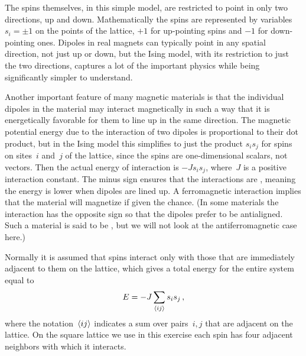 \documentclass[12pt]{article}
\begin{document}
\begin{exercises}
The spins themselves, in this simple model, are restricted to point in only
two directions, up and down.  Mathematically the spins are represented by
variables~$s_i=\pm1$ on the points of the lattice, $+1$ for up-pointing
spins and $-1$ for down-pointing ones.  Dipoles in real magnets can
typically point in any spatial direction, not just up or down, but the
Ising model, with its restriction to just the two directions, captures a
lot of the important physics while being significantly simpler to
understand.

Another important feature of many magnetic materials is that the individual
dipoles in the material may interact magnetically in such a way that it is
energetically favorable for them to line up in the same direction.  The
magnetic potential energy due to the interaction of two dipoles is
proportional to their dot product, but in the Ising model this simplifies
to just the product $s_is_j$ for spins on sites~$i$ and~$j$ of the lattice,
since the spins are one-dimensional scalars, not vectors.  Then the actual
energy of interaction is $-Js_is_j$, where~$J$ is a positive interaction
constant.  The minus sign ensures that the interactions are
, meaning the energy is lower when dipoles are
lined up.  A ferromagnetic interaction implies that the material will
magnetize if given the chance.  (In some materials the interaction has the
opposite sign so that the dipoles prefer to be antialigned.  Such a
material is said to be , but we will not
look at the antiferromagnetic case here.)

Normally it is assumed that spins interact only with those that are
immediately adjacent to them on the lattice, which gives a total energy for
the entire system equal to
\begin{displaymath}
E = -J \sum_{\langle ij\rangle} s_i s_j\,,
\end{displaymath}
where the notation~$\langle ij\rangle$ indicates a sum over pairs~$i,j$ that are
adjacent on the lattice.  On the square lattice we use in this exercise
each spin has four adjacent neighbors with which it interacts.


\end{exercises}
\end{document}
